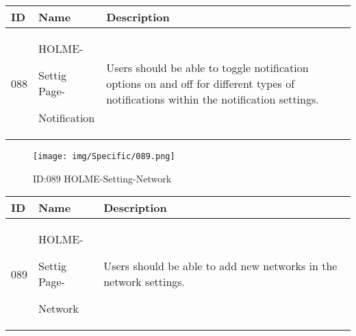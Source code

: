 \documentclass[conference]{IEEEtran}
\begin{document}
\begin{enumerate}
\begin{table}[h]
\begin{tabular}{|p{1cm}|p{1.8cm}|p{5.0cm}|}
        \hline
        ID & Name & Description\\ \hline
         088 \par  & HOLME-\par Settig Page- \par Notification & 
       Users should be able to toggle notification options on and off for different types of notifications within the notification settings.
         \\ \hline
    \end{tabular}
\end{table}
\begin{figure}[h]
\centering                                         
\texttt{[image: img/Specific/089.png]}
\caption{ID:089 HOLME-Setting-Network}
\end{figure}
\begin{table}[h]
\def\arraystretch{1.2} \small
    \begin{tabular}{|p{1cm}|p{1.8cm}|p{5.0cm}|}
        \hline
        ID & Name & Description\\ \hline
         089 \par  & HOLME-\par Settig Page- \par Network  & 
       Users should be able to add new networks in the network settings.
         \\ \hline
    \end{tabular}
\end{table}
\clearpage


\end{enumerate}
\end{document}
